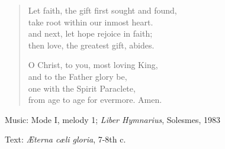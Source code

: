 \hymn



\setlength{\leftmargini}{2em}
\begin{verse}
Let faith, the gift first sought and found,\\
take root within our inmost heart.\\
and next, let hope rejoice in faith;\\
then love, the greatest gift, abides.

O Christ, to you, most loving King,\\
and to the Father glory be,\\
one with the Spirit Paraclete,\\
from age to age for evermore. Amen.
\end{verse}
\setlength{\leftmargini}{\defleftmargini}

\begin{hymnsource}
Music: Mode I, melody 1; \emph{Liber Hymnarius}, Solesmes, 1983

Text: \emph{Æterna cæli gloria}, 7-8th c.
\end{hymnsource}
